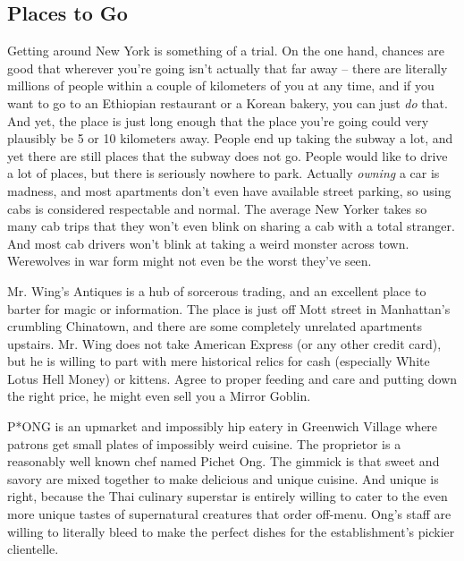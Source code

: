 \subsection{Places to Go}

\hspace{\parindent} Getting around New York is something of a trial. On the one hand, chances are good that wherever you're going isn't actually that far away -- there are literally millions of people within a couple of kilometers of you at any time, and if you want to go to an Ethiopian restaurant or a Korean bakery, you can just \textit{do} that. And yet, the place is just long enough that the place you're going could very plausibly be 5 or 10 kilometers away. People end up taking the subway a lot, and yet there are still places that the subway does not go. People would like to drive a lot of places, but there is seriously nowhere to park. Actually \textit{owning} a car is madness, and most apartments don't even have available street parking, so using cabs is considered respectable and normal. The average New Yorker takes so many cab trips that they won't even blink on sharing a cab with a total stranger. And most cab drivers won't blink at taking a weird monster across town. Werewolves in war form might not even be the worst they've seen.

Mr. Wing's Antiques is a hub of sorcerous trading, and an excellent place to barter for magic or information. The place is just off Mott street in Manhattan's crumbling Chinatown, and there are some completely unrelated apartments upstairs. Mr. Wing does not take American Express (or any other credit card), but he is willing to part with mere historical relics for cash (especially White Lotus Hell Money) or kittens. Agree to proper feeding and care and putting down the right price, he might even sell you a Mirror Goblin.

P*ONG is an upmarket and impossibly hip eatery in Greenwich Village where patrons get small plates of impossibly weird cuisine. The proprietor is a reasonably well known chef named Pichet Ong. The gimmick is that sweet and savory are mixed together to make delicious and unique cuisine. And unique is right, because the Thai culinary superstar is entirely willing to cater to the even more unique tastes of supernatural creatures that order off-menu. Ong's staff are willing to literally bleed to make the perfect dishes for the establishment's pickier clientelle.

